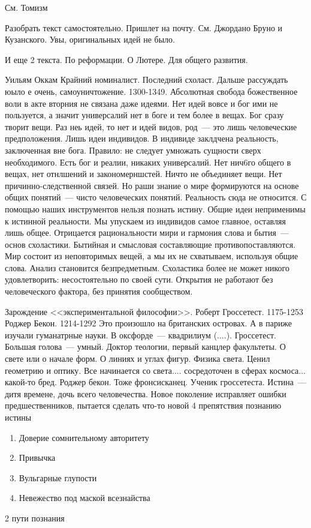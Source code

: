 См. Томизм

Разобрать текст самостоятельно. Пришлет на почту. См. Джордано Бруно и Кузанского. Увы, оригинальных идей не было.

И еще 2 текста. По реформации. О Лютере. Для общего развития.

Уильям Оккам
Крайний номиналист. Последний схоласт. Дальше рассуждать юыло е очень, самоуничтожение. 1300-1349.
Абсолютная свобода божественное воли в акте вторния не связана даже идеями. Нет идей вовсе и бог ими не пользуется, а значит универсалий нет в боге и тем более в вещах. Бог сразу творит вещи. Раз неь идей, то нет и идей видов, род~--- это лишь человеческие предположения. Лишь идеи индивидов. В индивиде заклдчена реальность, заключенная вне бога. Правило: не следует умножать сущности сверх необходимого. Есть бог и реалии, никаких универсалий. Нет нич6го общего в вещах, нет отнлшений и закономерншстей. Ничто не объединяет вещи. Нет причинно-следственной связей. Но раши знание о мире формируются на основе общих понятий~--- чисто человеческих понятий. Реальность сюда не относится. С помощью наших инструментов нельзя познать истину. Общие идеи неприменимы к истинной реальности. Мы упускаем из индивидов самое главное, оставляя лишь общее. Отрицается рациональности мири и гармония слова и бытия~--- основ схоластики. Бытийная и смысловая составляющие противопоставляются. Мир состоит из неповторимых вещей, а мы их не схватываем, используя общие слова. Анализ становится безпредметным. Схоластика более не может никого удовлетворить: несостоятельно по своей сути.
Открытия не работают без человеческого фактора, без принятия сообществом.

Зарождение <<экспериментальной философии>>.
Роберт Гроссетест. 1175-1253
Роджер Бекон. 1214-1292
Это произошло на британских островах. А в париже изучали гуманатрные науки. В оксфорде~--- квадрилиум (....).
Гроссетест. Большая голова~--- умный. Доктор теологии, первый канцлер факультеты. О свете или о начале форм. О линиях и углах фигур. Физика света. Ценил геометрию и оптику. Все начинается со света.... сосредоточен в сферах космоса... какой-то бред.
Роджер бекон. Тоже фронсисканец. Ученик гроссетеста. Истина~--- дитя времене, дочь всего человечества. Новое поколение исправляет ошибки предшественников, пытается сделать что-то новой
4 препятствия познанию истины

\begin{enumerate}
	\item Доверие сомнительному авторитету
	\item Привычка
	\item Вульгарные глупости
	\item Невежество под маской всезнайства
\end{enumerate}
2 пути познания

